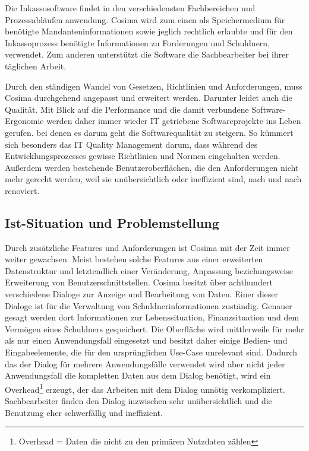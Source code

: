 Die Inkassosoftware findet in den verschiedensten Fachbereichen und Prozessabläufen anwendung. Cosima wird zum einen als Speichermedium für benötigte Mandanteninformationen sowie jeglich rechtlich erlaubte und für den Inkassoprozess benötigte Informationen zu Forderungen und Schuldnern, verwendet. Zum anderen unterstützt die Software die Sachbearbeiter bei ihrer täglichen Arbeit. 

Durch den ständigen Wandel von Gesetzen, Richtlinien und Anforderungen, muss Cosima durchgehend angepasst und erweitert werden. Darunter leidet auch die Qualität. Mit Blick auf die Performance und die damit verbundene Software-Ergonomie werden daher immer wieder IT getriebene Softwareprojekte ins Leben gerufen. bei denen es darum geht die Softwarequalität zu steigern. So kümmert sich besonders das IT Quality Management darum, dass während des Entwicklungsprozesses gewisse Richtlinien und Normen eingehalten werden. Außerdem werden bestehende Benutzeroberflächen, die den Anforderungen nicht mehr gerecht werden, weil sie unübersichtlich oder ineffizient sind, nach und nach renoviert.


\subsection{Ist-Situation und Problemstellung}
Durch zusätzliche Features und Anforderungen ist Cosima mit der Zeit immer weiter gewachsen. Meist bestehen solche Features aus einer erweiterten Datenstruktur und letztendlich einer Veränderung, Anpassung beziehungsweise Erweiterung von Benutzerschnittstellen. Cosima besitzt über achthundert verschiedene Dialoge zur Anzeige und Bearbeitung von Daten. Einer dieser Dialoge ist für die Verwaltung von Schuldnerinformationen zuständig. Genauer gesagt werden dort Informationen zur Lebenssituation, Finanzsituation und dem Vermögen eines Schuldners gespeichert. Die Oberfläche wird mittlerweile für mehr als nur einen Anwendungsfall eingesetzt und besitzt daher einige Bedien- und Eingabeelemente, die für den ursprünglichen Use-Case unrelevant sind. Dadurch das der Dialog für mehrere Anwendungsfälle verwendet wird aber nicht jeder Anwendungsfall die kompletten Daten aus dem Dialog benötigt, wird ein Overhead\footnote{Overhead = Daten die nicht zu den primären Nutzdaten zählen} erzeugt, der das Arbeiten mit dem Dialog unnötig verkompliziert. Sachbearbeiter finden den Dialog inzwischen sehr unübersichtlich und die Benutzung eher schwerfällig und ineffizient.

